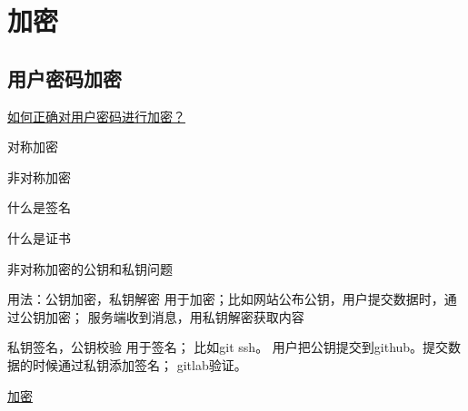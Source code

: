 \chapter{加密}


\section{用户密码加密}



\href{https://www.infoq.cn/article/how-to-encrypt-the-user-password-correctly}{如何正确对用户密码进行加密？}


对称加密

非对称加密

什么是签名


什么是证书


非对称加密的公钥和私钥问题

用法：公钥加密，私钥解密  用于加密；比如网站公布公钥，用户提交数据时，通过公钥加密； 服务端收到消息，用私钥解密获取内容

私钥签名，公钥校验 用于签名； 比如git ssh。 用户把公钥提交到github。提交数据的时候通过私钥添加签名； gitlab验证。


\href{https://www.liaoxuefeng.com/wiki/1252599548343744/1304227873816610}{加密}













